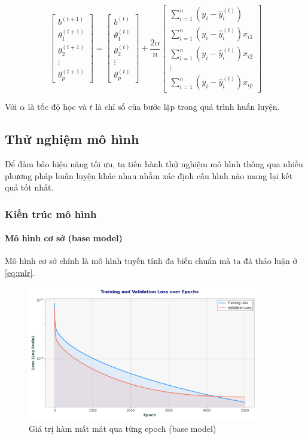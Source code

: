 \[
\begin{bmatrix}
    b^{(t+1)} \\
    \theta_1^{(t+1)} \\
    \theta_2^{(t+1)} \\
    \vdots \\
    \theta_p^{(t+1)}
\end{bmatrix} = 
\begin{bmatrix}
    b^{(t)} \\
    \theta_1^{(t)} \\
    \theta_2^{(t)} \\
    \vdots \\
    \theta_p^{(t)}
\end{bmatrix} + 
\frac{2\alpha}{n} 
\begin{bmatrix}
    \sum_{i=1}^n (y_i - \hat{y}_i^{(t)}) \\
    \sum_{i=1}^n (y_i - \hat{y}_i^{(t)})x_{i1} \\
    \sum_{i=1}^n (y_i - \hat{y}_i^{(t)})x_{i2} \\
    \vdots \\
    \sum_{i=1}^n (y_i - \hat{y}_i^{(t)})x_{ip}
\end{bmatrix}
\]

Với \(\alpha\) là tốc độ học và \(t\) là chỉ số của bước lặp trong quá trình huấn luyện.

\subsection{Thử nghiệm mô hình}
Để đảm bảo hiệu năng tối ưu, ta tiến hành thử nghiệm mô hình thông qua nhiều phương pháp huấn luyện khác nhau nhằm xác định cấu hình nào mang lại kết quả tốt nhất.

\subsubsection{Kiến trúc mô hình}
\paragraph{Mô hình cơ sở (base model)}Mô hình cơ sở chính là mô hình tuyến tính đa biến chuẩn mà ta đã thảo luận ở \eqref{eq:mlr}.

\begin{figure}[H]
    \centering
    \includegraphics[width=0.9\textwidth]{img_multiple/loss_base.png} %
    \caption{Giá trị hàm mất mát qua từng epoch (base model)}
    \label{fig:loss_base}
\end{figure}

